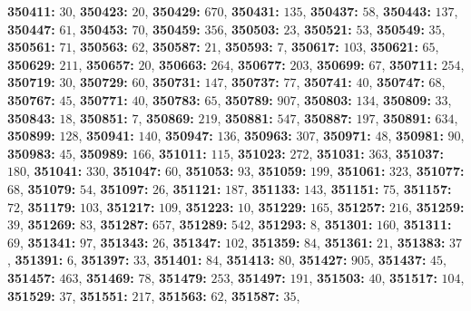 \textsf{\bfseries 350411:} $30$, \textsf{\bfseries 350423:} $20$, \textsf{\bfseries 350429:} $670$, \textsf{\bfseries 350431:} $135$, \textsf{\bfseries 350437:} $58$, \textsf{\bfseries 350443:} $137$, \textsf{\bfseries 350447:} $61$, \textsf{\bfseries 350453:} $70$, \textsf{\bfseries 350459:} $356$, \textsf{\bfseries 350503:} $23$, \textsf{\bfseries 350521:} $53$, \textsf{\bfseries 350549:} $35$, \textsf{\bfseries 350561:} $71$, \textsf{\bfseries 350563:} $62$, \textsf{\bfseries 350587:} $21$, \textsf{\bfseries 350593:} $7$, \textsf{\bfseries 350617:} $103$, \textsf{\bfseries 350621:} $65$, \textsf{\bfseries 350629:} $211$, \textsf{\bfseries 350657:} $20$, \textsf{\bfseries 350663:} $264$, \textsf{\bfseries 350677:} $203$, \textsf{\bfseries 350699:} $67$, \textsf{\bfseries 350711:} $254$, \textsf{\bfseries 350719:} $30$, \textsf{\bfseries 350729:} $60$, \textsf{\bfseries 350731:} $147$, \textsf{\bfseries 350737:} $77$, \textsf{\bfseries 350741:} $40$, \textsf{\bfseries 350747:} $68$, \textsf{\bfseries 350767:} $45$, \textsf{\bfseries 350771:} $40$, \textsf{\bfseries 350783:} $65$, \textsf{\bfseries 350789:} $907$, \textsf{\bfseries 350803:} $134$, \textsf{\bfseries 350809:} $33$, \textsf{\bfseries 350843:} $18$, \textsf{\bfseries 350851:} $7$, \textsf{\bfseries 350869:} $219$, \textsf{\bfseries 350881:} $547$, \textsf{\bfseries 350887:} $197$, \textsf{\bfseries 350891:} $634$, \textsf{\bfseries 350899:} $128$, \textsf{\bfseries 350941:} $140$, \textsf{\bfseries 350947:} $136$, \textsf{\bfseries 350963:} $307$, \textsf{\bfseries 350971:} $48$, \textsf{\bfseries 350981:} $90$, \textsf{\bfseries 350983:} $45$, \textsf{\bfseries 350989:} $166$, \textsf{\bfseries 351011:} $115$, \textsf{\bfseries 351023:} $272$, \textsf{\bfseries 351031:} $363$, \textsf{\bfseries 351037:} $180$, \textsf{\bfseries 351041:} $330$, \textsf{\bfseries 351047:} $60$, \textsf{\bfseries 351053:} $93$, \textsf{\bfseries 351059:} $199$, \textsf{\bfseries 351061:} $323$, \textsf{\bfseries 351077:} $68$, \textsf{\bfseries 351079:} $54$, \textsf{\bfseries 351097:} $26$, \textsf{\bfseries 351121:} $187$, \textsf{\bfseries 351133:} $143$, \textsf{\bfseries 351151:} $75$, \textsf{\bfseries 351157:} $72$, \textsf{\bfseries 351179:} $103$, \textsf{\bfseries 351217:} $109$, \textsf{\bfseries 351223:} $10$, \textsf{\bfseries 351229:} $165$, \textsf{\bfseries 351257:} $216$, \textsf{\bfseries 351259:} $39$, \textsf{\bfseries 351269:} $83$, \textsf{\bfseries 351287:} $657$, \textsf{\bfseries 351289:} $542$, \textsf{\bfseries 351293:} $8$, \textsf{\bfseries 351301:} $160$, \textsf{\bfseries 351311:} $69$, \textsf{\bfseries 351341:} $97$, \textsf{\bfseries 351343:} $26$, \textsf{\bfseries 351347:} $102$, \textsf{\bfseries 351359:} $84$, \textsf{\bfseries 351361:} $21$, \textsf{\bfseries 351383:} $37$, \textsf{\bfseries 351391:} $6$, \textsf{\bfseries 351397:} $33$, \textsf{\bfseries 351401:} $84$, \textsf{\bfseries 351413:} $80$, \textsf{\bfseries 351427:} $905$, \textsf{\bfseries 351437:} $45$, \textsf{\bfseries 351457:} $463$, \textsf{\bfseries 351469:} $78$, \textsf{\bfseries 351479:} $253$, \textsf{\bfseries 351497:} $191$, \textsf{\bfseries 351503:} $40$, \textsf{\bfseries 351517:} $104$, \textsf{\bfseries 351529:} $37$, \textsf{\bfseries 351551:} $217$, \textsf{\bfseries 351563:} $62$, \textsf{\bfseries 351587:} $35$, 
